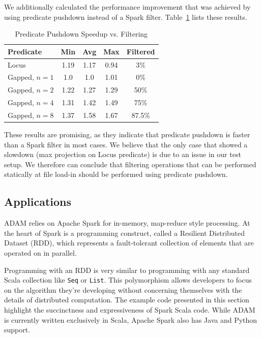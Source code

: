 \documentclass[10pt,twocolumn]{article}
\theoremstyle{plain}
\begin{document}
We additionally calculated the performance improvement that was achieved by using predicate pushdown instead of a Spark filter.
Table~\ref{tab:filter-vs-predicate} lists these results.

\begin{table}[h]
\caption{Predicate Pushdown Speedup vs. Filtering}
\label{tab:filter-vs-predicate}
\begin{center}
\begin{tabular}{| l | c  c c | c |}
\hline
\bf Predicate & \bf Min & \bf Avg & \bf Max & \bf Filtered \\
\hline
Locus & 1.19 & 1.17 & 0.94 & 3\% \\
Gapped, $n = 1$ & 1.0 & 1.0 & 1.01 & 0\% \\
Gapped, $n = 2$ & 1.22 & 1.27 & 1.29 & 50\% \\
Gapped, $n = 4$ & 1.31 & 1.42 & 1.49 & 75\% \\
Gapped, $n = 8$ & 1.37 & 1.58 & 1.67 & 87.5\% \\
\hline
\end{tabular}
\end{center}
\end{table}

These results are promising, as they indicate that predicate pushdown is faster than a Spark filter in most cases. We believe that the
only case that showed a slowdown (max projection on Locus predicate) is due to an issue in our test setup. We therefore can conclude
that filtering operations that can be performed statically at file load-in should be performed using predicate pushdown.

\subsection{Applications}
\label{sec:applications}

ADAM relies on Apache Spark for in-memory, map-reduce style processing. At the heart of Spark is a programming construct,
called a Resilient Distributed Dataset (RDD), which represents a fault-tolerant collection of elements that are
operated on in parallel. 

Programming with an RDD is very similar to programming with any standard Scala collection
like \texttt{Seq} or \texttt{List}. This polymorphism allows developers to focus on the algorithm they're developing 
without concerning themselves with the details of distributed computation. The example code presented in this section
highlight the succinctness and expressiveness of Spark Scala code. While ADAM is currently written exclusively in 
Scala, Apache Spark also has Java and Python support.
\end{document}
